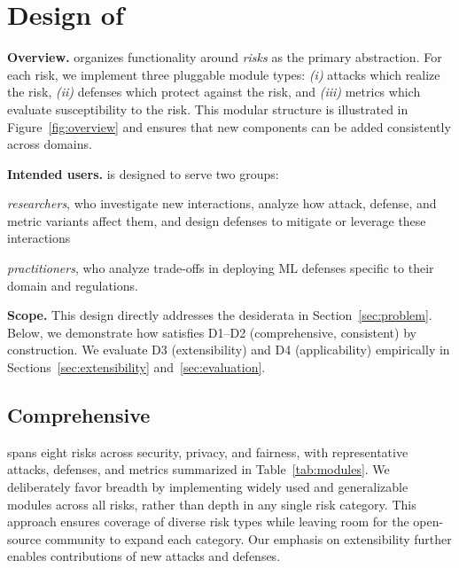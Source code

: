 \section{Design of \method}\label{sec:design}
\noindent\textbf{Overview.}
\method organizes functionality around \emph{risks} as the primary abstraction.
For each risk, we implement three pluggable module types:
\emph{(i)} attacks which realize the risk,
\emph{(ii)} defenses which protect against the risk, and
\emph{(iii)} metrics which evaluate susceptibility to the risk.
This modular structure is illustrated in Figure~\ref{fig:overview} and ensures that new components can be added consistently across domains.

\noindent\textbf{Intended users.}
\method is designed to serve two groups:
\begin{enumerate*}[label=\roman*),itemjoin={,\xspace}] %
    \item \emph{researchers}, who investigate new interactions, analyze how attack, defense, and metric variants affect them, and design defenses to mitigate or leverage these interactions
    \item \emph{practitioners}, who analyze trade-offs in deploying ML defenses specific to their domain and regulations.
\end{enumerate*}

\noindent\textbf{Scope.}
This design directly addresses the desiderata in Section~\ref{sec:problem}.
Below, we demonstrate how \method satisfies D1--D2 (comprehensive, consistent) by construction.
We evaluate D3 (extensibility) and D4 (applicability) empirically in Sections~\ref{sec:extensibility} and~\ref{sec:evaluation}.



\subsection{Comprehensive}

\method spans eight risks across security, privacy, and fairness, with representative attacks, defenses, and metrics summarized in Table~\ref{tab:modules}.
We deliberately favor breadth by implementing widely used and generalizable modules across all risks, rather than depth in any single risk category.
This approach ensures coverage of diverse risk types while leaving room for the open-source community to expand each category.
Our emphasis on extensibility further enables contributions of new attacks and defenses.

